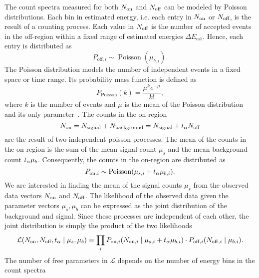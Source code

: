 The count spectra measured for both $N_\text{on}$ and $N_\text{off}$ can be modeled by Poisson distributions.
Each bin in estimated energy, i.e. each entry in $N_\text{on}$ or $N_\text{off}$, is the result of a counting process. Each value 
in $N_\text{off}$ is the number of accepted events in the off-region within a fixed range of estimated energies $\Delta E_\text{est}$.
Hence, each entry is distributed as 
\begin{equation*}
  P_{\mathrm{off}, i} \sim \operatorname{{Poisson}}(\mu_{b, i}).
\end{equation*}
The Poisson distribution models the number of independent events in a fixed space or time range. Its probability mass function 
is defined as 
\begin{equation}
  \label{eq:poisson}
  P_{\mathrm{Poisson}}(k) = \frac{\mu^k e^{-\mu}}{k!},
\end{equation} 
where $k$ is the number of events and $\mu$ is the mean of the Poisson distribution and its only parameter~\cite[287]{stats_degroot}.
The counts in the on-region 
\begin{equation*}
  N_\text{on} =  N_{\mathrm{signal}} + N_{\mathrm{background}} = N_{\mathrm{signal}} + t_{\alpha} N_\text{off}
\end{equation*}
are the result of two independent poisson processes.
The mean of the counts in the on-region is the sum of the mean signal count $\mu_{s}$ and the mean background count $t_{\alpha} \mu_b$.
Consequently, the counts in the on-region are distributed as 
\begin{equation*}
  P_{\mathrm{on}, i} \sim \operatorname{{Poisson}}\left(\mu_{s, i} + \talpha \mu_{b, i}\right).
\end{equation*}
We are interested in finding the mean of the signal counts $\mu_s$ from the observed data vectors $N_\text{on}$ and $N_\text{off}$. 
The likelihood of the observed data given the parameter vectors $\mu_s, \mu_b$ can be expressed as the joint distribution of the background and signal.
Since these processes are independent of each other, the joint distribution is simply the product of the two likelihoods
\begin{equation}
  \label{eq:full_ll}
  \operatorname{\mathcal{L}}\left( \Non, \Noff, \talpha \mid \mu_s, \mu_b \right) =  \prod_i P_{\mathrm{on}, i}\left(N_{\mathrm{on}, i} \mid  \mu_{s, i} + \talpha \mu_{b, i} \right) \cdot P_{\mathrm{off}, i}\left(N_{\mathrm{off}, i} \mid \mu_{b, i} \right).
\end{equation}
The number of free parameters in $\mathcal{L}$ depends on the number of energy bins in the count spectra 
